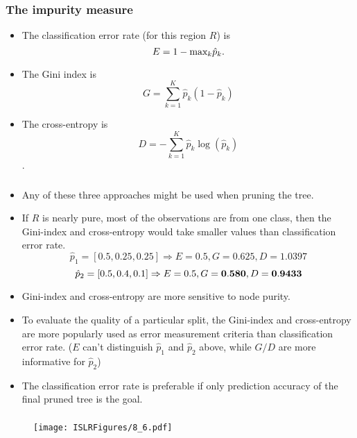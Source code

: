 \documentclass{beamer}
\begin{document}
                	\begin{frame}
                		\frametitle{The impurity measure}
                		\begin{itemize}
                		
                		
                		\item  The classification error rate (for this region $R$) is 
                		$$ E = 1 - \hbox{max}_k \hat p_k.$$
                		\item The Gini index is 
                		$$ G = \sum_{k=1}^K \hat p_k (1- \hat p_k)$$
                		\item  The cross-entropy is 
                		$$ D = - \sum_{k=1}^K \hat p_k \log (\hat p_k)$$.
                		 
                		
                	\end{itemize}
                \end{frame} 

       \begin{frame} 	
       	\frametitle{ }
       	\begin{itemize}
	       	\item Any of these three approaches might be used when pruning the tree.
       		\item  If $R$ is nearly pure, most of the observations 
       		are from one class, then 
       		the Gini-index and cross-entropy would take smaller values than classification error rate.
		$$ \hat{p}_1=[0.5,0.25,0.25] \Rightarrow E=0.5, G=0.625, D=1.0397 $$
       		 $$ \hat{p}_2=[0.5,0.4,0.1] \Rightarrow E=0.5, G= {\bf 0.580}, D= {\bf 0.9433} $$
       		\item   Gini-index and cross-entropy are more sensitive to node purity.
       		\item To evaluate the quality of a particular split, the Gini-index and cross-entropy are more popularly used as error measurement 
       		criteria than classification error rate. ($E$ can't distinguish $\hat{p}_1$ and $\hat{p}_2$ above, while $G/D$ are more informative for $\hat{p}_2$)
       		\item  The classification error rate is preferable if only prediction accuracy of the final pruned tree is the goal. 
       	\end{itemize}
       \end{frame}              
                
    
  
               \begin{frame}
               	\frametitle{ }
               	\begin{figure}
               		\centering
               		
               		\centering
               		\texttt{[image: ISLRFigures/8\_6.pdf]}
               		
               	\end{figure}
               \end{frame}
               
\end{document}
